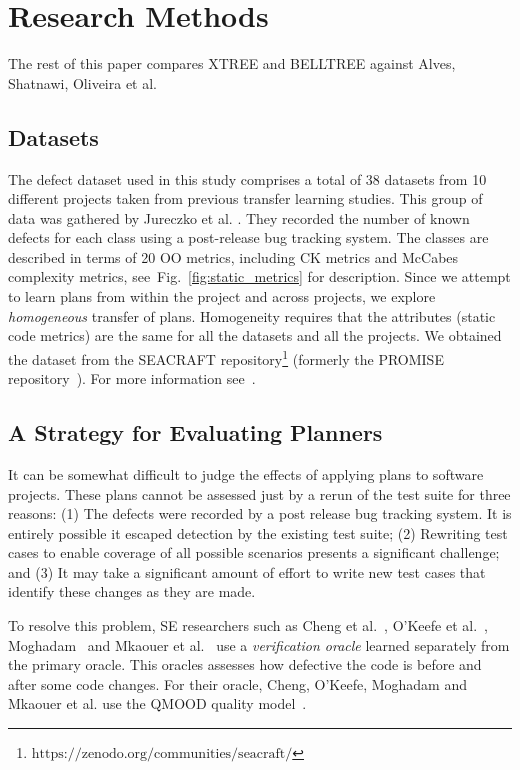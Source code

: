 \documentclass[10pt, journal, compsoc]{IEEEtran}
\newcommand{\fig}[1]{Fig.~\ref{fig:#1}}
\begin{document}
\section{Research Methods}
\label{sect:prelim}

The rest of this paper compares XTREE and BELLTREE against  
Alves, Shatnawi, Oliveira et al. 

\subsection{Datasets}
\label{sect:data}
The defect dataset used in this study comprises a total of 38 datasets from 10 different projects taken from previous transfer learning studies. This group of data was gathered by Jureczko et al. \cite{Jureczko2010}. They recorded the number of known defects for each class using a post-release bug tracking system. The classes are described in terms of 20 OO metrics, including CK metrics and McCabes complexity metrics, see~\fig{static_metrics} for description. Since we attempt to learn plans from within the project and across projects, we explore \textit{homogeneous} transfer of plans. Homogeneity requires that the attributes (static code metrics) are the same for all the datasets and all the projects. We obtained the dataset from the SEACRAFT repository\footnote{$\text{https://zenodo.org/communities/seacraft/}$} (formerly the PROMISE repository~\cite{menzies2016promise}). For more information see~\cite{krishna16}. 



\subsection{A Strategy for Evaluating Planners}

It can be somewhat difficult to judge the effects of applying plans
to software projects. These plans cannot be assessed just by a rerun of the test suite for three reasons: (1) The defects were recorded by a post release bug tracking system. It is entirely possible it escaped detection by the existing test suite; (2) Rewriting test cases to enable coverage of all possible scenarios presents a significant challenge; and (3) It may take a significant amount of effort to write new test cases that identify these changes as they are made.

To resolve this problem, SE researchers such as
Cheng et al.~\cite{Cheng10}, O'Keefe et al.~\cite{OKeeffe08, OKeeffe07}, 
Moghadam~\cite{Moghadam2011} and Mkaouer et al.~\cite{Mkaouer14}
use a {\em verification oracle} learned separately from the primary oracle. This oracles assesses how defective the code is before and after some code changes. For their oracle, Cheng, O'Keefe, Moghadam and Mkaouer et al. use the QMOOD quality model~\cite{Bansiya02}.
\end{document}
